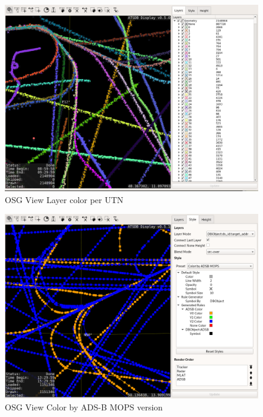 \begin{figure}[H]
    \hspace*{-2.5cm}
    \includegraphics[width=19cm,frame]{figures/osgview_style_utn.png}
  \caption{OSG View Layer color per UTN}
\end{figure}

\begin{figure}[H]
    \hspace*{-2.5cm}
    \includegraphics[width=19cm,frame]{figures/osgview_style_adsb_mops.png}
  \caption{OSG View Color by ADS-B MOPS version}
\end{figure}

